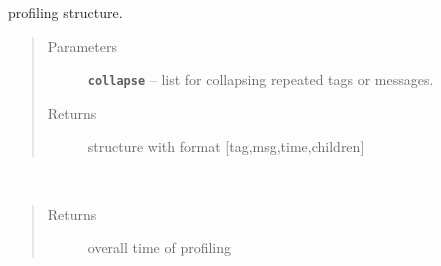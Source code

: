 \documentclass[letterpaper,10pt,english]{sphinxmanual}
\begin{document}
\begin{fulllineitems}
\begin{fulllineitems}
\label{RRtoolbox.lib:RRtoolbox.lib.root.profiler.structure}
profiling structure.
\begin{quote}\begin{description}
\item[{Parameters}] \leavevmode
\textbf{\texttt{collapse}} -- list for collapsing repeated tags or messages.

\item[{Returns}] \leavevmode
structure with format {[}tag,msg,time,children{]}

\end{description}\end{quote}

\end{fulllineitems}


\begin{fulllineitems}
\label{RRtoolbox.lib:RRtoolbox.lib.root.profiler.time}~\begin{quote}\begin{description}
\item[{Returns}] \leavevmode
overall time of profiling

\end{description}\end{quote}

\end{fulllineitems}


\end{fulllineitems}

\end{document}
